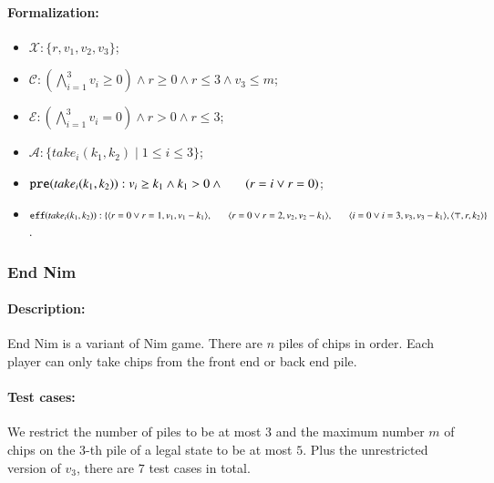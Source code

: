 \documentclass[review]{elsarticle}
\newcommand{\set}[1]{\{ #1 \}}
\newcommand{\tuple}[1]{\langle {#1} \rangle}
\newcommand{\true}{\top}
\newcommand{\statevar}{\mathcal{X}}
\newcommand{\act}{\mathcal{A}}
\newcommand{\constraint}{\mathcal{C}}
\newcommand{\estate}{\mathcal{E}}
\newcommand{\pre}{\mathtt{pre}}
\newcommand{\eff}{\mathtt{eff}}
\begin{document}
\paragraph{Formalization:}
\begin{itemize}
	\item $\statevar: \set{r, v_1, v_2, v_3}$;
	\item $\constraint: (\bigwedge_{i=1}^{3} v_i \ge 0) \wedge r \ge 0 \wedge r \le 3 \wedge v_3 \le m$;
	\item $\estate: (\bigwedge_{i=1}^{3} v_i = 0)\wedge r > 0 \wedge r \le 3 $;
	\item $\act:\set{take_i(k_1,k_2) {\mid}1 \le i\le 3}$;
	\item $\pre(take_i(k_1,k_2)) : v_i \ge k_1 \wedge k_1 > 0 \wedge \\ \hspace*{6mm}
	(r = i \vee r = 0)$;
	\item $\eff(take_i(k_1,k_2)) : \set{\tuple{r = 0\vee r = 1, v_1, v_1-k_1},\\ \hspace*{6mm}
		\tuple{r = 0\vee r = 2, v_2, v_2-k_1}, \\ \hspace*{6mm}
		\tuple{i=0\vee i=3, v_3, v_3-k_1},\tuple{\true, r, k_2}}$.
\end{itemize}

\subsubsection{End Nim \protect\cite{AlbN2001}}	
\paragraph{Description:} 
End Nim is a variant of Nim game.
There are $n $ piles of chips in order.
Each player can only take chips from the front end or back end pile.

\paragraph{Test cases:}
We restrict the number of piles to be at most $3$ and the maximum number $m$ of chips on the $3$-th pile of a legal state to be at most $5$.
Plus the unrestricted version of $v_3$, there are $7$ test cases in total.
\end{document}
